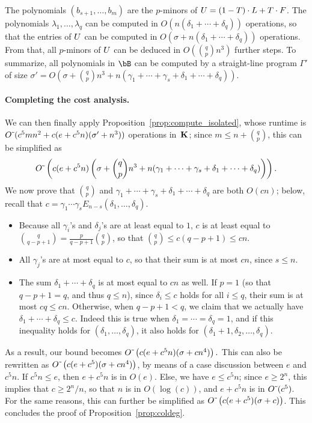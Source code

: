 \documentclass[12pt]{article}
\begin{document}
The polynomials $(b_{s+1},\dots,b_m)$ are the $p$-minors of
${U}=(1-T)\cdot{L}+T\cdot{F}$.  The polynomials $\lambda_1,\dots,\lambda_q$ can
be computed in $O(n (\delta_1+\cdots+\delta_q))$ operations, so that
the entries of ${U}$ can be computed in $O(\sigma +
n(\delta_1+\cdots+\delta_q))$ operations. From that, all $p$-minors of
${U}$ can be deduced in $O({q \choose p} n^3)$ further steps.  To
summarize, all polynomials in $\bB$ can be computed by a straight-line
program $\Gamma'$ of size $\sigma'=O(\sigma + {q \choose p} n^3 +n(\gamma_1+\cdots+\gamma_s+\delta_1+\cdots+\delta_q))$.

\paragraph{Completing the cost analysis.}
We can then finally apply Proposition~\ref{prop:compute_isolated},
whose runtime is ${O}{\,\tilde{ }\,}(c^5 m n^2 + c(e+c^5 n)(\sigma' + n^3))$ operations
in~$\mathbf{K}$; since $m \le n + {q \choose p}$, this can be simplified as
$${O}{\,\tilde{ }\,}\left (c(e+c^5 n)\left(\sigma + {q \choose p} n^3
+n(\gamma_1+\cdots+\gamma_s+\delta_1+\cdots+\delta_q)\right)\right).$$
We now prove that $ {q \choose p}$ and
$\gamma_1+\cdots+\gamma_s+\delta_1+\cdots+\delta_q$ are both
$O(cn)$; below, recall that $c=\gamma_1 \cdots \gamma_s E_{n-s}(\delta_1,\dots,\delta_q)$.
\begin{itemize}
\item Because all $\gamma_i$'s and $\delta_j$'s are at least equal to
  $1$, $c$ is at least equal to $ {q \choose {q-p+1}}= \frac
  p{q-p+1}{q \choose p}$, so that ${q \choose p} \le c(q-p+1) \le cn$.
\item All $\gamma_j$'s are at most equal to $c$, so that their sum is at most
  $cn$, since $s \le n$.
\item The sum $\delta_1+\cdots+\delta_q$ is at most equal to $cn$ as
  well.  If $p=1$ (so that $q-p+1=q$, and thus $q \le n$), since
  $\delta_i \le c$ holds for all $i\le q$, their sum is at most $cq\le
  cn$. Otherwise, when $q-p+1 < q$, we claim that we actually have
  $\delta_1+\cdots+\delta_q \le c$. Indeed this is true when
  $\delta_1=\cdots=\delta_q=1$, and if this inequality holds for
  $(\delta_1,\dots,\delta_q)$, it also holds for
  $(\delta_1+1,\delta_2,\dots,\delta_q)$.
\end{itemize}
As a result, our bound becomes ${O}{\,\tilde{ }\,}\left (c(e+c^5 n)(\sigma +
cn^4)\right).$  This can also be rewritten as ${O}{\,\tilde{ }\,}\left
(c(e+c^5 )(\sigma + cn^4)\right)$, by means of a 
 case discussion between $e$ and $c^5 n$. If $c^5 n \le e$,
then $e+c^5 n$ is in $O(e)$. Else,
we have $e \le c^5 n$; since $e \ge 2^n$, this implies 
that $c \ge 2^n/n$, so that $n$ is in $O(\log(c))$, 
and $e+c^5 n$ is in ${O}{\,\tilde{ }\,}(c^5)$. For the same reasons, 
this can further be simplified as  ${O}{\,\tilde{ }\,}\left
(c(e+c^5 )(\sigma + c)\right)$.
This concludes the proof of Proposition~\ref{prop:coldeg}.
\end{document}
